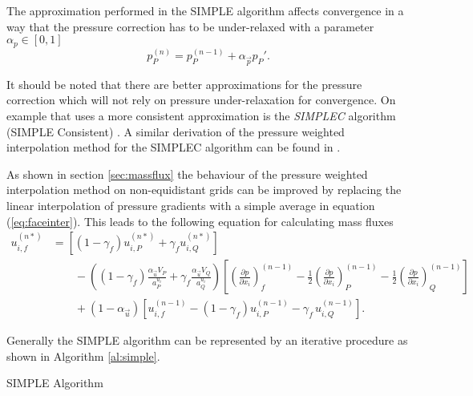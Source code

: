 The approximation performed in the SIMPLE algorithm affects convergence in a way that the pressure correction has to be under-relaxed with a parameter \(\alpha_p \in [0,1]\)
\begin{equation}
  \label{eq:pressupdate}
  p_P^{(n)} = p_P^{(n-1)} + \alpha_{\vec{p}} p_P'.
\end{equation}

It should be noted that there are better approximations for the pressure correction which will not rely on pressure under-relaxation for convergence. On example that uses a more consistent approximation is the \emph{SIMPLEC} algorithm (SIMPLE Consistent) \cite{doormaal84}. A similar derivation of the pressure weighted interpolation method for the SIMPLEC algorithm can be found in \cite{miller88}.

As shown in section \ref{sec:massflux} the behaviour of the pressure weighted interpolation method on non-equidistant grids can be improved by replacing the linear interpolation of pressure gradients with a simple average in equation (\ref{eq:faceinter}). This leads to the following equation for calculating mass fluxes
\begin{align}
  \label{eq:facecorr2}
  u_{i,f}^{(n*)} 
  &=
  \left[\left(1 - \gamma_f\right) u_{i,P}^{(n*)} + \gamma_f u_{i,Q}^{(n*)} \right] \nonumber\\[1em]
  &\quad\quad - 
  \left(\left(1 - \gamma_f\right) \frac{\alpha_\vec{u} V_P}{a_P^{u_i}} + \gamma_f \frac{\alpha_\vec{u} V_Q}{a_Q^{u_i}}\right)
  \left[ 
  \left(\frac{\partial p}{\partial x_i}\right)_f^{(n-1)} 
  -  \frac{1}{2} \left( \frac{\partial p}{\partial x_i} \right)_P^{(n-1)} 
  -  \frac{1}{2} \left(\frac{\partial p}{\partial x_i}\right)_Q^{(n-1)} 
  \right] \nonumber \\[1em]
  &\quad\quad + \left(1 - \alpha_\vec{u}\right) \left[ u_{i,f}^{(n-1)} - \left(1 - \gamma_f\right) u_{i,P}^{(n-1)} - \gamma_f \, u_{i,Q}^{(n-1)} \right].
\end{align}

Generally the SIMPLE algorithm can be represented by an iterative procedure as shown in Algorithm \ref{al:simple}.
\begin{algorithm}
\label{al:simple}
\caption{SIMPLE Algorithm}
\begin{algorithmic}
  \EndIf
\EndWhile
\end{algorithmic}
\end{algorithm}

